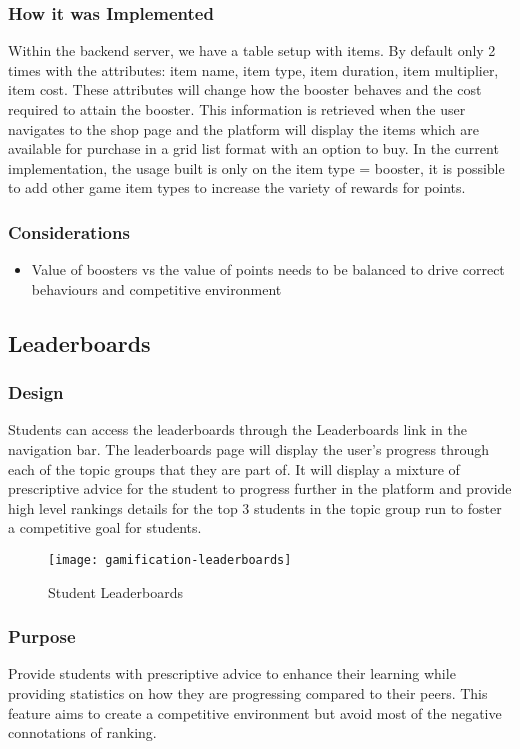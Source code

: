 \subsubsection{How it was Implemented}
Within the backend server, we have a table setup with items. By default only 2 times with the attributes: item name, item type, item duration, item multiplier, item cost. These attributes will change how the booster behaves and the cost required to attain the booster. This information is retrieved when the user navigates to the shop page and the platform will display the items which are available for purchase in a grid list format with an option to buy. In the current implementation, the usage built is only on the item type = booster, it is possible to add other game item types to increase the variety of rewards for points.

\subsubsection{Considerations}
\begin{itemize}
    \item Value of boosters vs the value of points needs to be balanced to drive correct behaviours and competitive environment
\end{itemize}

\newpage

\subsection{Leaderboards}
\subsubsection{Design}
Students can access the leaderboards through the Leaderboards link in the navigation bar. The leaderboards page will display the user’s progress through each of the topic groups that they are part of. It will display a mixture of prescriptive advice for the student to progress further in the platform and provide high level rankings details for the top 3 students in the topic group run to foster a competitive goal for students.

\begin{figure}[h!]
    \texttt{[image: gamification-leaderboards]}
    \centering
    \caption{Student Leaderboards}
\end{figure}

\newpage

\subsubsection{Purpose}
Provide students with prescriptive advice to enhance their learning while providing statistics on how they are progressing compared to their peers. This feature aims to create a competitive environment but avoid most of the negative connotations of ranking.

